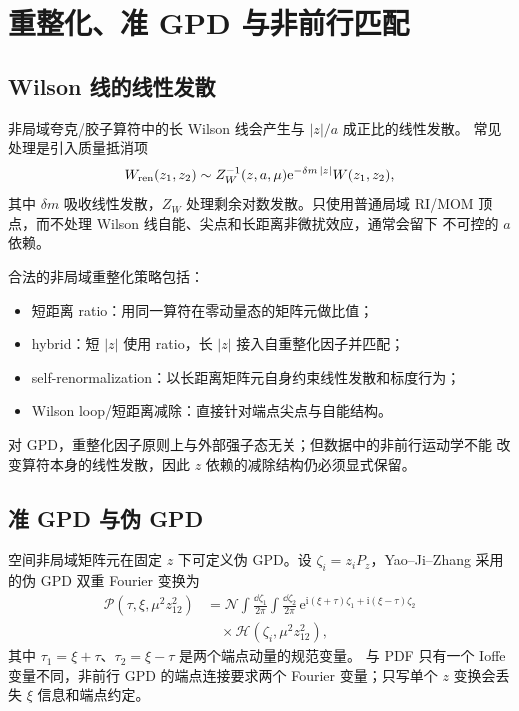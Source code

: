 \documentclass[12pt,a4paper]{ctexart}
\theoremstyle{definition}
\newcommand{\ii}{\mathrm{i}}
\newcommand{\ee}{\mathrm{e}}
\begin{document}
\section{重整化、准 GPD 与非前行匹配}

\subsection{Wilson 线的线性发散}

非局域夸克/胶子算符中的长 Wilson 线会产生与 $|z|/a$ 成正比的线性发散。
常见处理是引入质量抵消项
\begin{equation}
W_{\rm ren}(z_1,z_2)
\sim Z_W^{-1}(z,a,\mu)
\ee^{-\delta m\,|z|}
W(z_1,z_2),
\label{eq:wilson-linear-divergence}
\end{equation}
其中 $\delta m$ 吸收线性发散，$Z_W$ 处理剩余对数发散。只使用普通局域
RI/MOM 顶点，而不处理 Wilson 线自能、尖点和长距离非微扰效应，通常会留下
不可控的 $a$ 依赖。

合法的非局域重整化策略包括：
\begin{itemize}[leftmargin=*]
  \item 短距离 ratio：用同一算符在零动量态的矩阵元做比值；
  \item hybrid：短 $|z|$ 使用 ratio，长 $|z|$ 接入自重整化因子并匹配；
  \item self-renormalization：以长距离矩阵元自身约束线性发散和标度行为；
  \item Wilson loop/短距离减除：直接针对端点尖点与自能结构。
\end{itemize}
对 GPD，重整化因子原则上与外部强子态无关；但数据中的非前行运动学不能
改变算符本身的线性发散，因此 $z$ 依赖的减除结构仍必须显式保留。

\subsection{准 GPD 与伪 GPD}

空间非局域矩阵元在固定 $z$ 下可定义伪 GPD。设
$\zeta_i=z_iP_z$，Yao--Ji--Zhang 采用的伪 GPD 双重 Fourier 变换为
\begin{equation}
\begin{aligned}
\mathcal P(\tau,\xi,\mu^2z_{12}^2)
&=\mathcal N\int\frac{\dd\zeta_1}{2\pi}
\int\frac{\dd\zeta_2}{2\pi}\,
\ee^{\ii(\xi+\tau)\zeta_1+\ii(\xi-\tau)\zeta_2}\\
&\quad\times
\mathcal H(\zeta_i,\mu^2z_{12}^2),
\end{aligned}
\label{eq:pseudo-gpd-double-ft}
\end{equation}
其中 $\tau_1=\xi+\tau$、$\tau_2=\xi-\tau$ 是两个端点动量的规范变量。
与 PDF 只有一个 Ioffe 变量不同，非前行 GPD 的端点连接要求两个 Fourier
变量；只写单个 $z$ 变换会丢失 $\xi$ 信息和端点约定。
\end{document}
